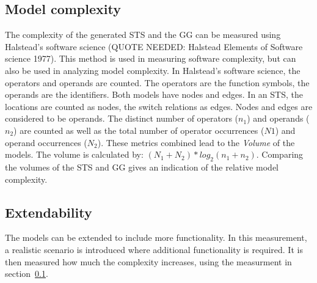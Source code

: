 \subsection{Model complexity}\label{sec:complexity_measurement}
The complexity of the generated STS and the GG can be measured using Halstead's software science (QUOTE NEEDED: Halstead Elements of Software science 1977). This method is used in measuring software complexity, but can also be used in analyzing model complexity. In Halstead's software science, the operators and operands are counted. The operators are the function symbols, the operands are the identifiers. Both models have nodes and edges. In an STS, the locations are counted as nodes, the switch relations as edges. Nodes and edges are considered to be operands. The distinct number of operators ($n_1$) and operands ($n_2$) are counted as well as the total number of operator occurrences ($N1$) and operand occurrences ($N_2$). These metrics combined lead to the \textit{Volume} of the models. The volume is calculated by: $(N_1+N_2)*\mathit{log}_2(n_1+n_2)$. Comparing the volumes of the STS and GG gives an indication of the relative model complexity.

\subsection{Extendability}
The models can be extended to include more functionality. In this measurement, a realistic scenario is introduced where additional functionality is required. It is then measured how much the complexity increases, using the measurment in section~\ref{sec:complexity_measurement}.
